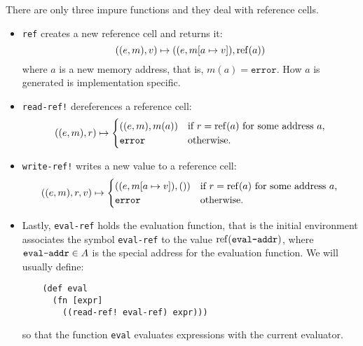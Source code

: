 There are only three impure functions and they deal with reference cells.
\begin{itemize}
\item \texttt{ref} creates a new reference cell and returns it:
  \[
    ((e,m), v) \mapsto ((e,m[a \mapsto v]), \mathrm{ref}(a))
  \]
  where $a$ is a new memory address, that is, $m(a) = \mathtt{error}$. How $a$
  is generated is implementation specific.
\item \texttt{read-ref!} dereferences a reference cell:
  \[
    ((e,m), r) \mapsto
    \begin{cases}
      ((e,m), m(a)) & \text{if $r = \mathrm{ref}(a)$ for some address $a$,}\\
      \mathtt{error} & \text{otherwise.}
    \end{cases}
  \]
\item \texttt{write-ref!} writes a new value to a reference cell:
  \[
    ((e,m), r, v) \mapsto
    \begin{cases}
      ((e,m[a \mapsto v]), ()) & \text{if $r = \mathrm{ref}(a)$ for some address $a$,}\\
      \mathtt{error} & \text{otherwise.}
    \end{cases}
  \]
\item Lastly, \texttt{eval-ref} holds the evaluation function, that is the
  initial environment associates the symbol \texttt{eval-ref} to the value
  $\mathrm{ref}(\text{\texttt{eval-addr}})$, where $\text{\texttt{eval-addr}} \in A$ is the special address for the
  evaluation function. We will usually define:
  \begin{lstlisting}
    (def eval
      (fn [expr]
        ((read-ref! eval-ref) expr)))
  \end{lstlisting}
  so that the function \texttt{eval} evaluates expressions with the current evaluator.
\end{itemize}
